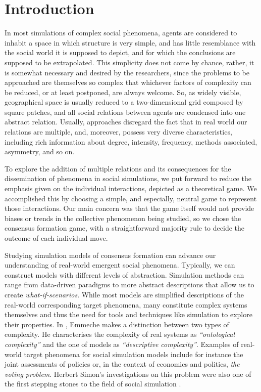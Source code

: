 \documentclass[preprint,number]{elsarticle}
\begin{document}
	\section{Introduction}
	\label{sec:introduction}
	
\noindent In most simulations of complex social phenomena, agents are considered to inhabit a space in which structure is very simple, and has little resemblance with the social world it is supposed to depict, and for which the conclusions are supposed to be extrapolated. This simplicity does not come by chance, rather, it is somewhat necessary and desired by the researchers, since the problems to be approached are themselves so complex that whichever factors of complexity can be reduced, or at least postponed, are always welcome. So, as widely visible, geographical space is usually reduced to a two-dimensional grid composed by square patches, and all social relations between  agents are condensed into one abstract relation. Usually, approaches disregard the fact that in real world our relations are multiple, and, moreover, possess very diverse characteristics, including rich information about degree, intensity, frequency, methods associated, asymmetry, and so on.
	
To explore the addition of multiple relations and its consequences for the dissemination of phenomena in social simulations, we put forward to reduce the emphasis given on the individual interactions, depicted as a theoretical game. We accomplished this by choosing a simple, and especially, neutral game to represent those interactions. Our main concern was that the game itself would not provide biases or trends in the collective phenomenon being studied, so we chose the consensus formation game, with a straightforward majority rule to decide the outcome of each individual move. 

	Studying simulation models of consensus formation can advance our understanding of real-world emergent social phenomena. Typically, we can construct models with different levels of abstraction. Simulation methods can range from data-driven paradigms to more abstract descriptions that allow us to create \textit{what-if-scenarios}. While most models are simplified descriptions of the real-world corresponding target phenomena, many constitute complex systems themselves and thus the need for tools and techniques like simulation to explore their properties. In \cite{Emmeche1997}, Emmeche makes a distinction between two types of complexity. He characterises the complexity of real systems as \textit{``ontological complexity''} and the one of models as \textit{``descriptive complexity''}. Examples of real-world target phenomena for social simulation models include for instance the joint assessments of policies or, in the context of economics and politics, \textit{the voting problem}. Herbert Simon's investigations on this problem were also one of the first stepping stones to the field of social simulation \cite{Simon1954}.
	
\end{document}
